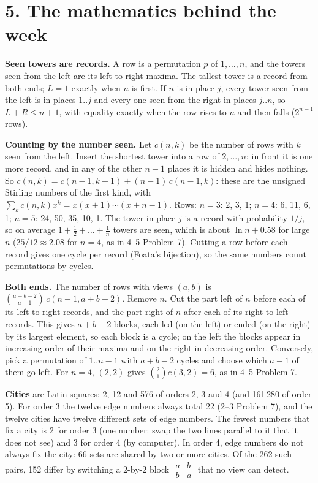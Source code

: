 \documentclass[11pt]{extarticle}
\begin{document}
\section{5. The mathematics behind the week}

\textbf{Seen towers are records.} A row is a permutation $p$ of $1,\dots,n$, and the towers seen from the left are its left-to-right maxima. The tallest tower is a record from both ends; $L=1$ exactly when $n$ is first. If $n$ is in place $j$, every tower seen from the left is in places $1..j$ and every one seen from the right in places $j..n$, so $L+R\le n+1$, with equality exactly when the row rises to $n$ and then falls ($2^{n-1}$ rows).

\textbf{Counting by the number seen.} Let $c(n,k)$ be the number of rows with $k$ seen from the left. Insert the shortest tower into a row of $2,\dots,n$: in front it is one more record, and in any of the other $n-1$ places it is hidden and hides nothing. So $c(n,k)=c(n-1,k-1)+(n-1)\,c(n-1,k)$: these are the unsigned Stirling numbers of the first kind, with $\sum_k c(n,k)x^k = x(x+1)\cdots(x+n-1)$. Rows: $n=3$: 2, 3, 1; $n=4$: 6, 11, 6, 1; $n=5$: 24, 50, 35, 10, 1. The tower in place $j$ is a record with probability $1/j$, so on average $1+\frac12+\dots+\frac1n$ towers are seen, which is about $\ln n+0.58$ for large $n$ ($25/12\approx2.08$ for $n=4$, as in 4--5 Problem 7). Cutting a row before each record gives one cycle per record (Foata's bijection), so the same numbers count permutations by cycles.

\textbf{Both ends.} The number of rows with views $(a,b)$ is $\binom{a+b-2}{a-1}\,c(n-1,a+b-2)$. Remove $n$. Cut the part left of $n$ before each of its left-to-right records, and the part right of $n$ after each of its right-to-left records. This gives $a+b-2$ blocks, each led (on the left) or ended (on the right) by its largest element, so each block is a cycle; on the left the blocks appear in increasing order of their maxima and on the right in decreasing order. Conversely, pick a permutation of $1..n-1$ with $a+b-2$ cycles and choose which $a-1$ of them go left. For $n=4$, $(2,2)$ gives $\binom21 c(3,2)=6$, as in 4--5 Problem 7.

\textbf{Cities} are Latin squares: 2, 12 and 576 of orders 2, 3 and 4 (and 161\,280 of order 5). For order 3 the twelve edge numbers always total 22 (2--3 Problem 7), and the twelve cities have twelve different sets of edge numbers. The fewest numbers that fix a city is 2 for order 3 (one number: swap the two lines parallel to it that it does not see) and 3 for order 4 (by computer). In order 4, edge numbers do not always fix the city: 66 sets are shared by two or more cities. Of the 262 such pairs, 152 differ by switching a 2-by-2 block $\begin{smallmatrix}a&b\\b&a\end{smallmatrix}$ that no view can detect.
\end{document}

